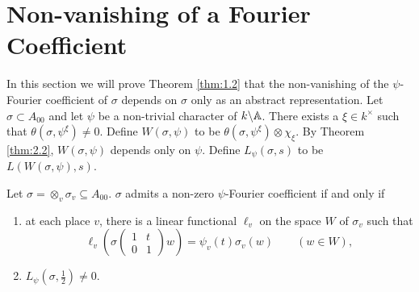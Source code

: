 \section{Non-vanishing of a Fourier Coefficient}
\label{sec:4}

In this section we will prove Theorem \ref{thm:1.2} that the non-vanishing of the $\psi$-Fourier coefficient of $\sigma$ depends on $\sigma$ only as an abstract representation.
Let $\sigma \subset A_{00}$ and let $\psi$ be a non-trivial character of $k \backslash \mathbb{A}$.
There exists a $\xi \in k^\times$ such that $\theta(\sigma, \psi^\xi) \neq 0$.
Define $W(\sigma, \psi)$ to be $\theta(\sigma, \psi^\xi) \otimes \chi_\xi$.
By Theorem \ref{thm:2.2}, $W(\sigma, \psi)$ depends only on $\psi$.
Define $L_\psi(\sigma, s)$ to be $L(W(\sigma, \psi), s)$.

\begin{theorem}
\label{thm:4.1}
Let $\sigma = \otimes_v \sigma_v \subseteq A_{00}$.
$\sigma$ admits a non-zero $\psi$-Fourier coefficient if and only if
\begin{enumerate}[label=\roman*)]
    \item at each place $v$, there is a linear functional $\ell_v$ on the space $W$ of $\sigma_v$ such that
    \[
        \ell_v\left(\sigma\begin{pmatrix}
            1 & t \\ 0 & 1
        \end{pmatrix}w\right) = \psi_v(t) \sigma_v(w) \qquad (w \in W),
    \]
    \item $L_\psi(\sigma, \frac{1}{2}) \neq 0$.
\end{enumerate}
\end{theorem}

